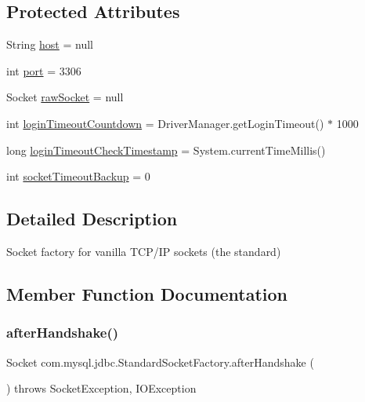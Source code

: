 \subsection*{Protected Attributes}
\begin{DoxyCompactItemize}
\item 
String \mbox{\hyperlink{classcom_1_1mysql_1_1jdbc_1_1_standard_socket_factory_ab21c6df0f1198825c6576d08ceb6df8e}{host}} = null
\item 
int \mbox{\hyperlink{classcom_1_1mysql_1_1jdbc_1_1_standard_socket_factory_add4c4ffea995298547e8a0f89b5dfc8e}{port}} = 3306
\item 
Socket \mbox{\hyperlink{classcom_1_1mysql_1_1jdbc_1_1_standard_socket_factory_aa463117daf5d860f96eb0e7b3b0d0193}{raw\+Socket}} = null
\item 
int \mbox{\hyperlink{classcom_1_1mysql_1_1jdbc_1_1_standard_socket_factory_a1be8452167eba6ce040a6a37c5ad202b}{login\+Timeout\+Countdown}} = Driver\+Manager.\+get\+Login\+Timeout() $\ast$ 1000
\item 
long \mbox{\hyperlink{classcom_1_1mysql_1_1jdbc_1_1_standard_socket_factory_a2e9a85215a399d2fcfaffc1b785cc0df}{login\+Timeout\+Check\+Timestamp}} = System.\+current\+Time\+Millis()
\item 
int \mbox{\hyperlink{classcom_1_1mysql_1_1jdbc_1_1_standard_socket_factory_a92a15c4aaa69c2c068ae1d7106e65a29}{socket\+Timeout\+Backup}} = 0
\end{DoxyCompactItemize}


\subsection{Detailed Description}
Socket factory for vanilla T\+C\+P/\+IP sockets (the standard) 

\subsection{Member Function Documentation}
\mbox{\label{classcom_1_1mysql_1_1jdbc_1_1_standard_socket_factory_a7387cf40cb31ead4c39dcc642d1980b5}} 
\subsubsection{\texorpdfstring{after\+Handshake()}{afterHandshake()}}
{\footnotesize\ttfamily Socket com.\+mysql.\+jdbc.\+Standard\+Socket\+Factory.\+after\+Handshake (\begin{DoxyParamCaption}{ }\end{DoxyParamCaption}) throws Socket\+Exception, I\+O\+Exception}

